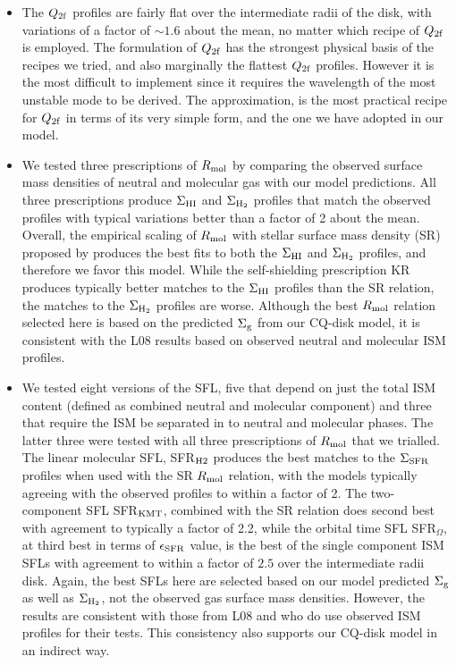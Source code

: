 \documentclass[12pt,preprint]{aastex}
\begin{document}
\begin{itemize}
\item The $Q_{\rm 2f}$ profiles are fairly flat over the intermediate radii of the disk, with variations of a factor of $\sim 1.6$ about the mean, no matter which recipe of $Q_{\rm 2f}$ is employed.  The \citet{raf01} formulation of $Q_{\rm 2f}$ has the strongest physical basis of the recipes we tried, and also marginally the flattest $Q_{\rm 2f}$ profiles. However it is the most difficult to implement since it requires the wavelength of the most unstable mode to be derived.  The \citet{wan94} approximation, is the most practical recipe for $Q_{\rm 2f}$ in terms of  its very simple form, and the one we have adopted in our model.



\item We tested three prescriptions of $R_{\rm mol}$ by comparing the observed surface mass densities of neutral and molecular gas with our model predictions.  All three prescriptions produce $\Sigma_{\rm HI}$ and $\Sigma_{\rm H_2}$ profiles that match the observed profiles with typical variations better than a factor of 2 about the mean.  Overall, the empirical scaling of  $R_{\rm mol}$ with stellar surface mass density (SR) proposed by \citet{ler08} produces the best fits to both the $\Sigma_{\rm HI}$ and $\Sigma_{\rm H_2}$ profiles, and therefore we favor this model. While the \citet{kru08,kru09a,kru09} self-shielding prescription KR produces typically better matches to the $\Sigma_{\rm HI}$ profiles than the SR relation, the matches to the $\Sigma_{\rm H_2}$ profiles are worse. 
Although the best $  R_{\rm mol}$ relation selected here is based on the predicted $  \Sigma_{\rm g}$ from our CQ-disk model, it is consistent with the L08 results based on observed neutral and molecular ISM profiles.


\item We tested eight versions of the SFL, five that depend on just the total ISM content (defined as combined neutral and molecular component) and three that require the ISM be separated in to neutral and molecular phases. The latter three were tested with all three prescriptions of $R_{\rm mol}$ that we trialled.  The linear molecular SFL, SFR$_{\rm H2}$ produces the best matches to the $\Sigma_{\rm SFR}$ profiles when used with the SR $R_{\rm mol}$ relation, with the models typically agreeing with the observed profiles to within a factor of 2.  The two-component SFL SFR$_{\rm KMT}$, combined with the SR relation does second best with agreement to typically a factor of 2.2, while the orbital time SFL SFR$_\Omega$, at third best in terms of $\epsilon_{\rm SFR}$ value, is the best of the single component ISM SFLs with agreement to within a factor of $2.5$ over the intermediate radii disk.
Again, the best SFLs here are selected based on our model predicted $\Sigma_{\rm g}$ as well as $\Sigma_{\rm H_2}$, not the observed gas surface mass densities. However, the results are consistent with those from L08 and \citet{tan10} who do use observed ISM profiles for their tests. This consistency also supports our CQ-disk model in an indirect way.




\end{itemize}
\end{document}
